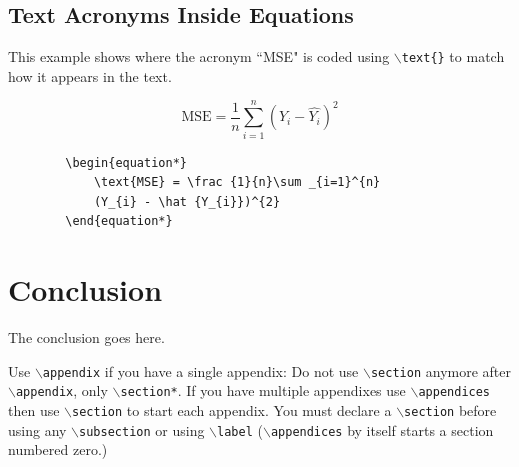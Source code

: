 \documentclass[lettersize,journal]{IEEEtran}
\begin{document}
	\subsection{ Text Acronyms Inside Equations}
	This example shows where the acronym ``MSE" is coded using $\backslash${\tt{text\{\}}} to match how it appears in the text.
	
	\begin{equation*}
		\text{MSE} = \frac {1}{n}\sum _{i=1}^{n}(Y_{i} - \hat {Y_{i}})^{2}
	\end{equation*}
	
	\begin{verbatim}
		\begin{equation*}
			\text{MSE} = \frac {1}{n}\sum _{i=1}^{n}
			(Y_{i} - \hat {Y_{i}})^{2}
		\end{equation*}
	\end{verbatim}
	
	\section{Conclusion}
	The conclusion goes here.
	
	
	
	
	
	{
		Use $\backslash${\tt{appendix}} if you have a single appendix:
		Do not use $\backslash${\tt{section}} anymore after $\backslash${\tt{appendix}}, only $\backslash${\tt{section*}}.
		If you have multiple appendixes use $\backslash${\tt{appendices}} then use $\backslash${\tt{section}} to start each appendix.
		You must declare a $\backslash${\tt{section}} before using any $\backslash${\tt{subsection}} or using $\backslash${\tt{label}} ($\backslash${\tt{appendices}} by itself
		starts a section numbered zero.)}
	
	
	
	
	
	
\end{document}
